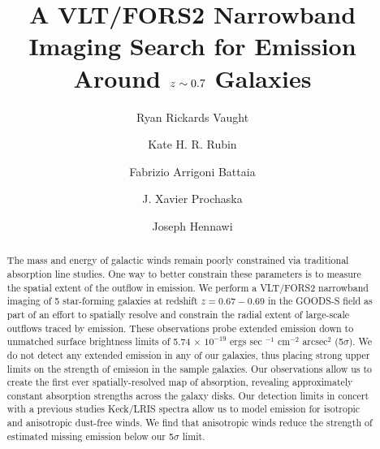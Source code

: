 \documentclass[twocolumn]{aastex61}
\begin{document}
\title{A VLT/FORS2 Narrowband Imaging Search for  Emission Around $\lowercase{z}\sim0.7$ Galaxies }
\author{Ryan Rickards Vaught}
 
 \author{Kate H. R. Rubin }
 
 \author{Fabrizio Arrigoni Battaia }

 \author{J. Xavier Prochaska}
 
\author{Joseph Hennawi}


\begin{abstract}

The mass and energy of galactic winds remain poorly constrained via traditional absorption line studies. One way to better constrain these parameters is to measure the spatial extent of the outflow in emission. We perform a VLT/FORS2 narrowband imaging of 5 star-forming galaxies at redshift $z=0.67-0.69$ in the GOODS-S field as part of an effort to spatially resolve and constrain the radial extent of large-scale outflows traced by  emission. These observations probe extended  emission down to unmatched surface brightness limits of 5.74 $\times$ $10^{-19}$ ergs sec $^{-1}$ cm$^{-2}$ arcsec$^2$ (5$\sigma$).  We do not detect any extended  emission in any of our galaxies, thus placing strong upper limits on the strength of  emission in the sample galaxies. Our observations allow us to create the first ever spatially-resolved map of  absorption, revealing approximately constant absorption strengths across the galaxy disks. Our detection limits in concert with a previous studies Keck/LRIS spectra allow us to model  emission for isotropic and anisotropic dust-free winds. We find that anisotropic winds reduce the strength of estimated missing  emission below our 5$\sigma$ limit.

\end{abstract}
\end{document}
